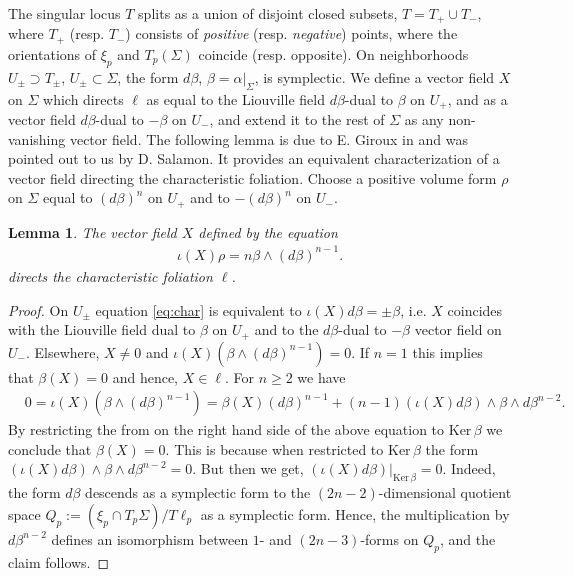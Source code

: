 \documentclass[12pt]{amsart}
\theoremstyle{plain}
\newtheorem{lemma}[theorem]{Lemma}
\theoremstyle{definition}
\theoremstyle{remark}
\newcommand{\Ker}{\mathrm{Ker\,}}
\begin{document}
The singular locus $T$  splits   as a union of disjoint closed subsets, $T=T_+\cup T_-$, where $T_+$ (resp. $T_-$) consists of {\em positive} (resp. {\em negative}) points, where  the orientations  of $\xi_p$ and $T_p(\Sigma)$  coincide (resp. opposite). On    neighborhoods $U_\pm\supset T_\pm$, $U_\pm\subset\Sigma$, the form $d\beta$, $\beta=\alpha|_\Sigma$, is symplectic. We define a vector field $X$ on $\Sigma$ which directs  $\ell$ as equal to the Liouville field $d\beta$-dual to $ \beta$ on $U_+$,  and as a vector field     $d\beta$-dual to $- \beta$ on $U_-$, and extend it to the rest of $\Sigma$ as any non-vanishing vector field. The following lemma is due to E. Giroux in \cite{Gi} and was  pointed out to us by  D. Salamon. It provides an equivalent characterization of a vector field directing the characteristic foliation.
 Choose a  positive volume form $\rho$ on $\Sigma$  equal to $ (d\beta)^n$  on $U_+$  and  to $ -(d\beta)^n$    on $U_-$. 
 \begin{lemma} 
\label{lm:Dietmar2}
The vector field $X$ defined by the equation
  \begin{align}\label{eq:char}
  \iota(X)\rho=n\beta\wedge (d\beta)^{n-1}.
  \end{align}
    directs the characteristic foliation $\ell$.
    \end{lemma}
    \begin{proof}
 On $U_\pm$  equation \eqref{eq:char} is equivalent to
  $\iota(X)d\beta=\pm \beta$, i.e. $X$ coincides with the Liouville field  dual to
  $\beta$ on $U_+$  and to the $d\beta$-dual to $- \beta$ vector field  on $U_-$.
   Elsewhere, $X\neq 0$ and  $  \iota(X)(\beta\wedge(d\beta)^{n-1})=0.$ If $n=1$ this implies that $\beta(X)=0$ and hence, $X\in\ell$. For $n\geq 2$ we have  
  \begin{align*} &0=\iota(X)(\beta\wedge(d\beta)^{n-1})=
  \beta(X)(d\beta)^{n-1}+(n-1) \left(\iota(X)d\beta\right)\wedge\beta\wedge  d\beta^{n-2}. 
  \end{align*}
    By restricting the from on the right hand side of the above equation  to $\Ker\beta$ we conclude that   $\beta(X)=0.$ This is because when restricted 
    to  $\Ker\beta$   the form $\left(\iota(X)d\beta\right)\wedge\beta\wedge d\beta^{n-2}=0.$  But then we get,
    $ \left(\iota(X)d\beta\right)|_{\Ker\beta} =0$. Indeed, the form $d\beta$ descends   as a symplectic form to the $(2n-2)$-dimensional quotient space $Q_p:=(\xi_p\cap T_p\Sigma)/T\ell_p$ as a symplectic form. Hence, the multiplication  by   $d\beta^{n-2}$ defines an isomorphism between $1$- and $(2n-3)$-forms on $Q_p$, and the claim follows.
    

\end{proof}
\end{document}
